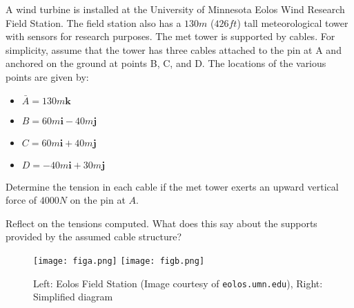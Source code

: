 
A wind turbine is installed at the University of Minnesota Eolos Wind Research Field Station. The field station also has a $130 m$ ($426 ft$) tall meteorological tower with sensors for research purposes. The met tower is supported by cables. For simplicity, assume that the tower has three cables attached to the pin at A and anchored on the ground at points B, C, and D. The locations of the various points are given by:
\begin{itemize}
  \item $\bar{A} = 130m \textbf{k}$
  \item $B = 60m \textbf{i} - 40m \textbf{j}$
  \item $C = 60m \textbf{i} + 40m \textbf{j}$
  \item $D = - 40m \textbf{i} + 30m \textbf{j}$
\end{itemize}  
Determine the tension in each cable if the met tower exerts an upward vertical force of $4000 N$ on the pin at $A$.

Reflect on the tensions computed.  What does this say about the supports provided by the assumed cable structure?

\begin{figure}[ht!]
  \centering
  \texttt{[image: figa.png]}
  \texttt{[image: figb.png]}
  \caption*{Left: Eolos Field Station (Image courtesy of \texttt{eolos.umn.edu}), Right: Simplified diagram}
\end{figure}

\iftoggle{flagSoln}{%
\vspace{.5cm}
\rule{\textwidth}{.4pt}
\vspace{.5cm}
\textbf{Solution:}
\begin{figure}[ht!]
  \centering
  \texttt{[image: soln.png]}
\end{figure}
}{%
}%

